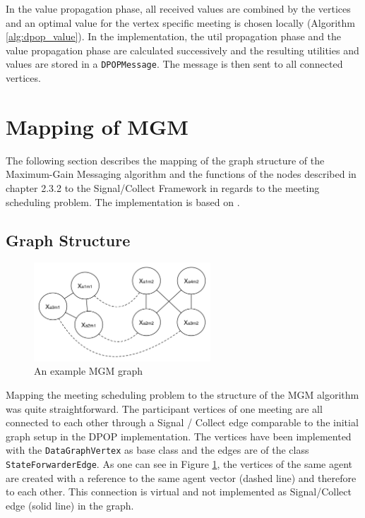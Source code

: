 \vspace{7 mm}
In the value propagation phase, all received values are combined by the vertices and an optimal value for the vertex specific meeting is chosen locally (Algorithm \ref{alg:dpop_value}). In the implementation, the util propagation phase and the value propagation phase are calculated successively and the resulting utilities and values are stored in a \texttt{DPOPMessage}. The message is then sent to all connected vertices.

\section{Mapping of MGM}

The following section describes the mapping of the graph structure of the Maximum-Gain Messaging algorithm and the functions of the nodes described in chapter 2.3.2 to the Signal/Collect Framework in regards to the meeting scheduling problem. The implementation is based on \cite{Chapman2010}.

\subsection{Graph Structure}
\begin{figure}[H]
\includegraphics[width=250px]{graphics/mgm_graph}
\centering
\caption{An example MGM graph}
\label{fig:mgm_graph}
\end{figure}

Mapping the meeting scheduling problem to the structure of the MGM algorithm was quite straightforward. The participant vertices of one meeting are all connected to each other through a Signal / Collect edge comparable to the initial graph setup in the DPOP implementation. The vertices have been implemented with the \texttt{DataGraphVertex} as base class and the edges are of the class \texttt{StateForwarderEdge}. As one can see in Figure \ref{fig:mgm_graph}, the vertices of the same agent are created with a reference to the same agent vector (dashed line) and therefore to each other. This connection is virtual and not implemented as Signal/Collect edge (solid line) in the graph.

